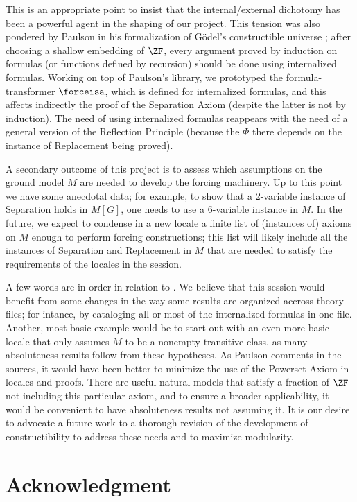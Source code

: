 This is an appropriate point to insist that the internal/external
dichotomy has been a powerful agent in the shaping of our project.
This tension was also pondered by Paulson in his formalization of
G\"odel's constructible universe \cite{MR2051585}; after choosing a
shallow embedding of $\ZF$, every argument proved by induction on
formulas (or functions defined by recursion) should be done using
internalized formulas. Working on top of Paulson's library, we
prototyped the formula-transformer $\forceisa$, which is defined for
internalized formulas, and this affects indirectly the proof of the
Separation Axiom (despite the latter is not by induction). The need of
using internalized formulas reappears with the need of a general
version of the Reflection Principle (because the $\Phi$ there depends
on the instance of Replacement being proved).

A secondary outcome of this project is to assess which assumptions on
the ground model $M$ are needed to develop the forcing machinery. Up
to this point we have some anecdotal data; for example, to show that a
2-variable instance of Separation holds in $M[G]$, one needs to use a
6-variable instance in $M$. In the future, we expect to condense in a
new locale a finite list of (instances of) axioms on $M$ enough to
perform forcing constructions; this list will likely include all the
instances of Separation and Replacement in $M$ that are needed to
satisfy the requirements of the locales in the
 session.

A few words are in order in relation to .
We believe that this  session  would benefit from some changes in
the way some results are organized accross theory files; for
intance, by cataloging all or most of the internalized formulas in one
file. Another, most basic example would be to start out with an even
more basic locale that only assumes $M$ to be a nonempty transitive class,
as many absoluteness results follow from these hypotheses.
As Paulson comments in the sources, it would have been better to
minimize the use of the Powerset Axiom in locales and proofs. There
are  useful natural models that satisfy a fraction of $\ZF$ not including
this particular axiom, and to ensure a broader applicability, it would
be convenient to have  absoluteness results not assuming it.
It is our desire to advocate a future work to a thorough
revision of the development of constructibility to address these needs
and to maximize modularity.


\section*{Acknowledgment}


